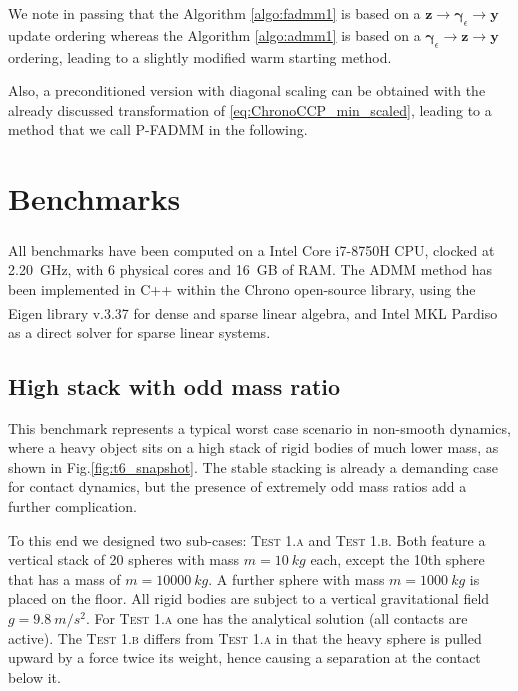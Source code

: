 \documentclass[AMA,STIX1COL]{WileyNJD-v2}
\newcommand{\vect}[1]{\bm{#1}}
\begin{document}
We note in passing that the Algorithm \ref{algo:fadmm1} is based on a 
$\vect{z} \rightarrow \vect{\gamma}_\epsilon \rightarrow \vect{y}$ 
update ordering whereas the Algorithm \ref{algo:admm1} is based on a 
$\vect{\gamma}_\epsilon \rightarrow  \vect{z} \rightarrow  \vect{y}$ ordering, leading
to a slightly modified warm starting method.

Also, a preconditioned version with diagonal scaling can be obtained with the already discussed transformation of \eqref{eq:ChronoCCP_min_scaled}, leading to a method that we call P-FADMM in the following.



\section{Benchmarks}

All benchmarks have been computed on a Intel\textsuperscript{\textregistered} Core\textsuperscript{\texttrademark} i7-8750H CPU, clocked at \SI{2.20}{GHz}, with 6 physical cores and \SI{16}{GB} of RAM. 
The ADMM method has been implemented
in C++ within the Chrono open-source library, using the Eigen library v.3.37 for dense and sparse linear algebra, and Intel\textsuperscript{\textregistered} MKL Pardiso as a direct solver for sparse linear systems.

\subsection{High stack with odd mass ratio}

This benchmark represents a typical worst case scenario in non-smooth dynamics, where
a heavy object sits on a high stack of rigid bodies of much lower mass, as shown in Fig.\ref{fig:t6_snapshot}. The stable stacking
is already a demanding case for contact dynamics, but the presence of extremely odd mass ratios add a
further complication. 

To this end we designed two sub-cases: \textsc{Test 1.a} and \textsc{Test 1.b}. Both feature
a vertical stack of 20 spheres with mass $m=\SI{10}{kg}$ each, except the 10th sphere that has
a mass of $m=\SI{10000}{kg}$. A further sphere with mass $m=\SI{1000}{kg}$ is placed on the floor.
All rigid bodies are subject to a vertical gravitational field $g=\SI{9.8}{m/s^2}$. For \textsc{Test 1.a}
one has the analytical solution (all contacts are active). The \textsc{Test 1.b}
differs from \textsc{Test 1.a} in that the heavy sphere is pulled upward by a force twice its weight, hence
causing a separation at the contact below it.
\end{document}

